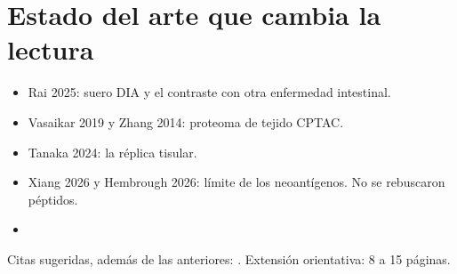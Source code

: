 \section{Estado del arte que cambia la lectura}
\begin{itemize}
\item Rai 2025: suero DIA y el contraste con otra enfermedad intestinal. \cite{rai2025}
\item Vasaikar 2019 y Zhang 2014: proteoma de tejido CPTAC. \cite{vasaikar2019,zhang2014}
\item Tanaka 2024: la réplica tisular. \cite{tanaka2024}
\item Xiang 2026 y Hembrough 2026: límite de los neoantígenos. No se rebuscaron péptidos. \cite{xiang2026,hembrough2026}
\item {}
\end{itemize}
Citas sugeridas, además de las anteriores: \cite{geyer2019,leek2010,gabay1999,cox2008,smyth2004}.
Extensión orientativa: 8 a 15 páginas.
